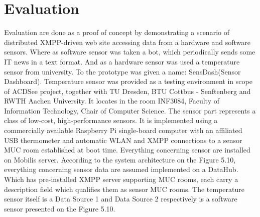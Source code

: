 \section{Evaluation}
Evaluation are done as a proof of concept by demonstrating a scenario of distributed XMPP-driven web site accessing data from a hardware and software sensors. Where as software sensor was taken a bot, which periodically sends some IT news in a text format. And as a hardware sensor was used a temperature sensor from university. To the prototype was given a name: SensDash(Sensor Dashboard). Temperature sensor was provided as a testing environment in scope of ACDSee project, together with TU Dresden, BTU Cottbus - Senftenberg and RWTH Aachen University. It locates in the room INF3084, Faculty of Information Technology, Chair of Computer Science. The sensor part represents a class of low-cost, high-performance sensors. It is implemented using a commercially available Raspberry Pi single-board computer with an affiliated USB thermometer and automatic WLAN and XMPP connections to a sensor MUC room established at boot time. Everything concerning sensor are installed on Mobilis server. According to the system architecture on the Figure 5.10, everything concerning sensor data are assumed implemented on a DataHub. Which has pre-installed XMPP server supporting MUC rooms, each carry a description field which qualifies them as sensor MUC rooms. The temperature sensor itself is a Data Source 1 and Data Source 2 respectively is a software sensor  presented on the Figure 5.10.

